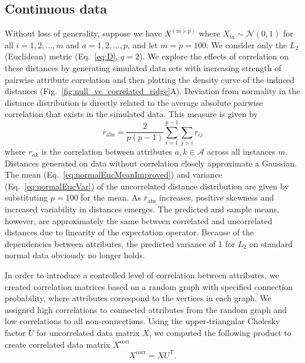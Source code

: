 \documentclass[10pt,letterpaper]{article}
\begin{document}
\subsection*{Continuous data}

Without loss of generality, suppose we have $X^{(m \times p)}$ where $X_{ia} \sim \mathcal{N}(0,1)$ for all $i=1,2,\dots,m$ and $a=1,2,\dots,p$, and let $m=p=100$. We consider only the $L_2$ (Euclidean) metric (Eq.~\ref{eq:D}, $q=2$). We explore the effects of correlation on these distances by generating simulated data sets with increasing strength of pairwise attribute correlation and then plotting the density curve of the induced distances (Fig.~\ref{fig:null_vs_correlated_ridge}A). Deviation from normality in the distance distribution is directly related to the average absolute pairwise correlation that exists in the simulated data. This measure is given by
%
\begin{equation}\label{eq:abs_corr}
\bar{r}_\text{abs} = \frac{2}{p(p-1)}\sum^{p-1}_{i=1} \sum_{j > i} r_{ij}
\end{equation}
%
where $r_{ak}$ is the correlation between attributes $a,k \in \mathcal{A}$ across all instances $m$. Distances generated on data without correlation closely approximate a Gaussian. The mean (Eq.~\ref{eq:normalEucMeanImproved}) and variance (Eq.~\ref{eq:normalEucVar}) of the uncorrelated distance distribution are given by substituting $p=100$ for the mean. As $\bar{r}_\text{abs}$ increases, positive skewness and increased variability in distances emerges. The predicted and sample means, however, are approximately the same between correlated and uncorrelated distances due to linearity of the expectation operator. Because of the dependencies between attributes, the predicted variance of 1 for $L_2$ on standard normal data obviously no longer holds. 

In order to introduce a controlled level of correlation between attributes, we created correlation matrices based on a random graph with specified connection probability, where attributes correspond to the vertices in each graph. We assigned high correlations to connected attributes from the random graph and low correlations to all non-connections. Using the upper-triangular Cholesky factor $U$ for uncorrelated data matrix $X$, we computed the following product to create correlated data matrix $X^\text{corr}$
%
\begin{equation}\label{eq:cholesky}
X^\text{corr} = X U^\text{T}.
\end{equation}
\end{document}
